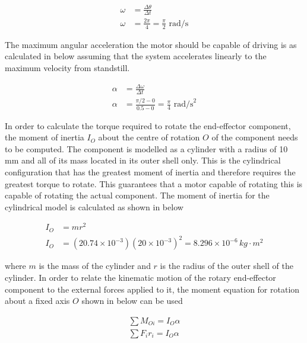 \begin{align}
    \omega&=\frac{\Delta \theta}{\Delta t}
    \label{eqn:angular-velocity} \\
    \omega&=\frac{2\pi}{4}=\frac{\pi}{2} \text{ rad/s}
\end{align}

The maximum angular acceleration the motor should be capable of driving is as calculated in  below assuming that the system accelerates linearly to the maximum velocity from standstill.

\begin{align}
    \alpha&=\frac{\Delta \omega}{\Delta t} 
    \label{eqn:angular-acceleration} \\
    \alpha&=\frac{\pi / 2 - 0}{0.5 - 0}=\frac{\pi}{4} \text{ rad/s}^2
\end{align}

In order to calculate the torque required to rotate the end-effector component, the moment of inertia $I_O$ about the centre of rotation $O$ of the component needs to be computed. The component is modelled as a cylinder with a radius of 10 mm and all of its mass located in its outer shell only. This is the cylindrical configuration that has the greatest moment of inertia and therefore requires the greatest torque to rotate. This guarantees that a motor capable of rotating this is capable of rotating the actual component. The moment of inertia for the cylindrical model is calculated as shown in  below

\begin{align}
    I_O&=mr^2
    \label{eqn:moment-of-inertia} \\
    I_O&=(20.74 \times 10^{-3})(20 \times 10^{-3})^2=8.296 \times 10^{-6} \, kg\cdot m^2
\end{align}

where $m$ is the mass of the cylinder and $r$ is the radius of the outer shell of the cylinder. In order to relate the kinematic motion of the rotary end-effector component to the external forces applied to it, the moment equation for rotation about a fixed axis $O$ shown in  below can be used

\begin{align}
    \sum M_{Oi} = I_O \alpha
    \label{eqn:moment-equation} \\
    \sum F_i r_i = I_O \alpha
\end{align}

